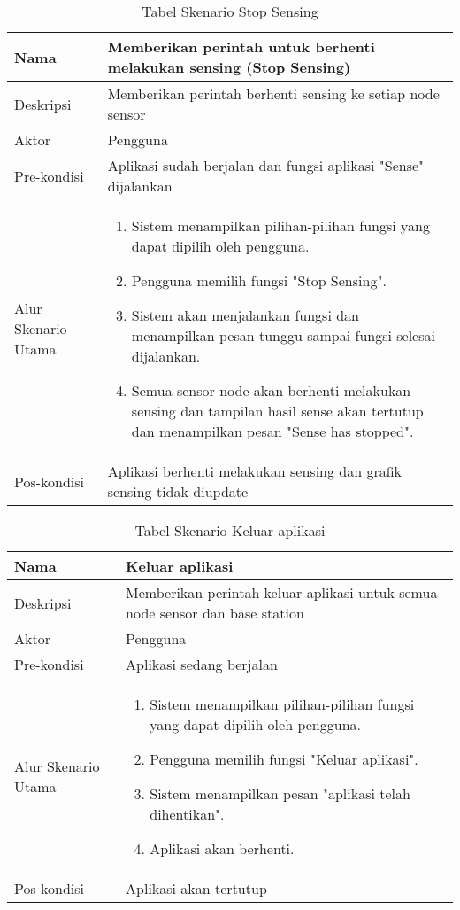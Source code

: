 \begin{table}[H]
	\centering
	\caption{Tabel Skenario Stop Sensing}
		\begin{tabular}{|p{}|p{}|}
    	\hline
        Nama & Memberikan perintah untuk berhenti melakukan sensing (Stop Sensing) \\ 
        \hline
        Deskripsi & Memberikan perintah berhenti sensing ke setiap node sensor\\ 
        \hline
        Aktor & Pengguna\\
		\hline
		Pre-kondisi & Aplikasi sudah berjalan dan fungsi aplikasi "Sense" dijalankan\\
		\hline
        Alur Skenario Utama & \begin{enumerate}
				\item Sistem menampilkan pilihan-pilihan fungsi yang dapat dipilih oleh pengguna.
				\item Pengguna memilih fungsi "Stop Sensing".
				\item Sistem akan menjalankan fungsi dan menampilkan pesan tunggu sampai fungsi selesai dijalankan.
				\item Semua sensor node akan berhenti melakukan sensing dan tampilan hasil sense akan tertutup dan menampilkan pesan "Sense has stopped".
			\end{enumerate}\\
		\hline
		Pos-kondisi & Aplikasi berhenti melakukan sensing dan grafik sensing tidak diupdate\\
		\hline
    \end{tabular}
\end{table}



\begin{table}[H]
	\centering
	\caption{Tabel Skenario Keluar aplikasi}
		\begin{tabular}{|p{}|p{}|}
    	\hline
        Nama & Keluar aplikasi \\ 
        \hline
        Deskripsi & Memberikan perintah keluar aplikasi untuk semua node sensor dan base station\\ 
        \hline
        Aktor & Pengguna\\
		\hline
		Pre-kondisi & Aplikasi sedang berjalan\\
		\hline
        Alur Skenario Utama & \begin{enumerate}
				\item Sistem menampilkan pilihan-pilihan fungsi yang dapat dipilih oleh pengguna.
				\item Pengguna memilih fungsi "Keluar aplikasi".
				\item Sistem menampilkan pesan "aplikasi telah dihentikan".
				\item Aplikasi akan berhenti.
			\end{enumerate}\\
		\hline
		Pos-kondisi & Aplikasi akan tertutup \\
		\hline
    \end{tabular}
\end{table}


